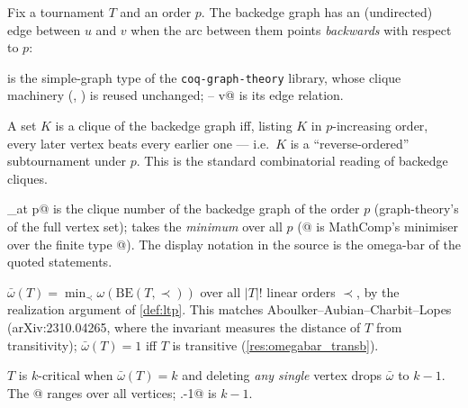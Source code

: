 
Fix a tournament $T$ and an order $p$. The backedge graph has an
(undirected) edge between $u$ and $v$ when the arc between them points
\emph{backwards} with respect to $p$:



\noindent
\rocqinline@sgraph@ is the simple-graph type of the
\texttt{coq-graph-theory} library, whose clique machinery
(\rocqinline@cliques@, \rocqinline@omega@) is reused unchanged;
\rocqinline@u -- v@ is its edge relation.

\begin{faithnote}
A set $K$ is a clique of the backedge graph iff, listing $K$ in
$p$-increasing order, every later vertex beats every earlier one ---
i.e.\ $K$ is a ``reverse-ordered'' subtournament under $p$. This is
the standard combinatorial reading of backedge cliques.
\end{faithnote}




\noindent
\rocqinline@omegab_at p@ is the clique number of the backedge graph of
the order $p$ (graph-theory's \rocqinline@omega@ of the full vertex
set); \rocqinline@omegabar@ takes the \emph{minimum} over all $p$
(@ is MathComp's minimiser over the finite
type @). The display notation in the source is
the omega-bar of the quoted statements.

\begin{faithnote}
$\bar\omega(T) = \min_{\prec} \omega(\mathrm{BE}(T,\prec))$ over all
$|T|!$ linear orders $\prec$, by the realization argument of
\cref{def:ltp}. This matches Aboulker--Aubian--Charbit--Lopes
(arXiv:2310.04265, where the invariant measures the distance of $T$
from transitivity); $\bar\omega(T) = 1$ iff $T$ is transitive
(\cref{res:omegabar_transb}).
\end{faithnote}




\noindent $T$ is $k$-critical when $\bar\omega(T) = k$ and deleting
\emph{any single} vertex drops $\bar\omega$ to $k-1$. The
\rocqinline@[forall v : T, ...]@ ranges over all vertices;
\rocqinline@k.-1@ is $k - 1$.

